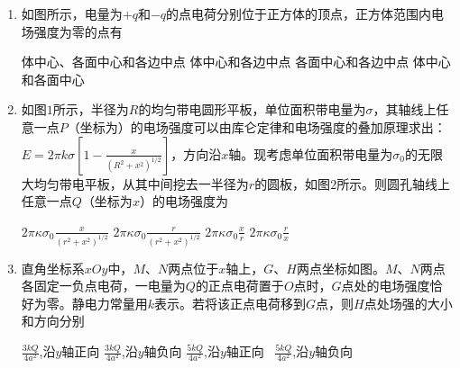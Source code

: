 \begin{enumerate}[leftmargin=0em]
\item
{}
如图所示，电量为$ +q $和$ -q $的点电荷分别位于正方体的顶点，正方体范围内电场强度为零的点有  
\begin{figure}[h!]
\centering

\end{figure}

\fourchoices
{体中心、各面中心和各边中点}
{体中心和各边中点}
{各面中心和各边中点 }
{体中心和各面中心}





\item
{}
如图$ 1 $所示，半径为$ R $的均匀带电圆形平板，单位面积带电量为$\sigma$，其轴线上任意一点$ P $（坐标为）的电场强度可以由库仑定律和电场强度的叠加原理求出：$E = 2 \pi k \sigma \left[ 1 - \frac { x } { \left( R ^ { 2 } + x ^ { 2 } \right) ^ { 1 / 2 } } \right]$，方向沿$ x $轴。现考虑单位面积带电量为$\sigma _ { 0 } $的无限大均匀带电平板，从其中间挖去一半径为$ r $的圆板，如图$ 2 $所示。则圆孔轴线上任意一点$ Q $（坐标为$ x $）的电场强度为  
\begin{figure}[h!]
\centering

\end{figure}

\fourchoices
{$2 \pi \kappa \sigma _ { 0 } \frac { x } { \left( r ^ { 2 } + x ^ { 2 } \right) ^ { 1 / 2 } }$}
{$2 \pi \kappa \sigma _ { 0 } \frac { r } { \left( r ^ { 2 } + x ^ { 2 } \right) ^ { 1 / 2 } }$}
{$2 \pi \kappa \sigma _ { 0 } \frac { x } { r }$}
{$2 \pi \kappa \sigma _ { 0 } \frac { r } { x }$}





\item
{}
直角坐标系$ xOy $中，$ M $、$ N $两点位于$ x $轴上，$ G $、$ H $两点坐标如图。$ M $、$ N $两点各固定一负点电荷，一电量为$ Q $的正点电荷置于$ O $点时，$ G $点处的电场强度恰好为零。静电力常量用$ k $表示。若将该正点电荷移到$ G $点，则$ H $点处场强的大小和方向分别  
\begin{figure}[h!]
\centering

\end{figure}

\fourchoices
{$\frac { 3 k Q } { 4 a ^ { 2 } }$,沿$ y $轴正向}
{$\frac { 3 k Q } { 4 a ^ { 2 } }$,沿$ y $轴负向}
{$\frac { 5 k Q } { 4 a ^ { 2 } }$,沿$ y $轴正向 }
{$\frac { 5 k Q } { 4 a ^ { 2 } }$,沿$ y $轴负向}






\end{enumerate}
